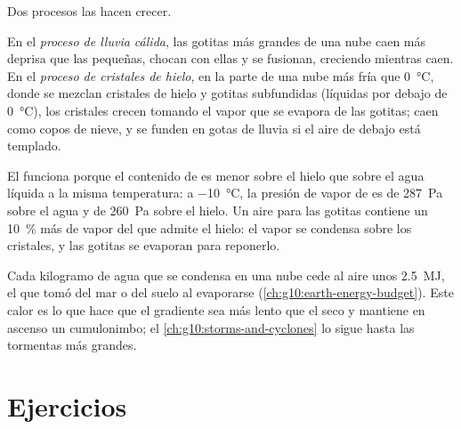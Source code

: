 Dos procesos las hacen crecer.

\begin{definition}\label{def:g10:why-clouds-form:rain-processes}
En el \emph{proceso de lluvia cálida},
las gotitas más grandes de una nube caen más deprisa que las pequeñas,
chocan con ellas y se fusionan, creciendo mientras caen. En el
\emph{proceso de cristales de hielo},
en la parte de una nube más fría que \qty{0}{\degreeCelsius}, donde se
mezclan cristales de hielo y gotitas subfundidas (líquidas por debajo de
\qty{0}{\degreeCelsius}), los cristales crecen tomando el vapor que se
evapora de las gotitas; caen como copos de nieve, y se funden en gotas de
lluvia si el aire de debajo está templado.
\end{definition}

El  funciona porque el contenido de 
es menor sobre el hielo que sobre el agua líquida a la misma temperatura: a
\qty{-10}{\degreeCelsius}, la presión de vapor de  es de
\qty{287}{Pa} sobre el agua y de \qty{260}{Pa} sobre el hielo. Un aire
 para las gotitas contiene un \qty{10}{\percent} más de vapor del
que admite el hielo: el vapor se condensa sobre los cristales, y las gotitas
se evaporan para reponerlo.

\begin{remark}\label{rem:g10:why-clouds-form:latent}
Cada kilogramo de agua que se condensa en una nube cede al aire unos
\qty{2.5}{MJ}, el  que tomó del mar o del suelo al evaporarse
(\cref{ch:g10:earth-energy-budget}). Este calor es lo que hace que el
gradiente  sea más lento que el seco y mantiene en ascenso un
cumulonimbo; el \cref{ch:g10:storms-and-cyclones} lo sigue hasta las
tormentas más grandes.
\end{remark}

\section{Ejercicios}


